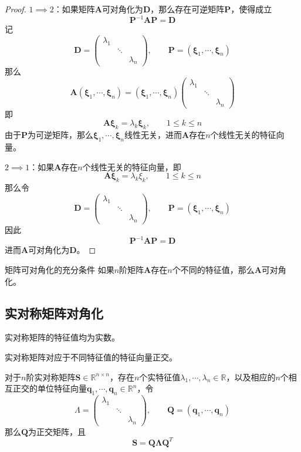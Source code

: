 \documentclass[lang = cn, scheme = chinese, thmcnt = section]{elegantbook}
\newcommand{\R}{\mathbb{R}}            %
\newcommand{\bs}{\boldsymbol}          %
\begin{document}
\begin{proof}
	$1\implies 2$：如果矩阵$\bs{A}$可对角化为$\bs{D}$，那么存在可逆矩阵$\bs{P}$，使得成立
	$$
	\bs{P}^{-1}\bs{AP}=\bs{D}
	$$
	记
	$$
	\bs{D}=\begin{pmatrix}
		\lambda_1 & & \\
		& \ddots & \\
		& & \lambda_n
	\end{pmatrix},\qquad 
	\bs{P}=(\bs{\xi}_1,\cdots,\bs{\xi}_n)
	$$
	那么
	$$
	\bs{A}(\bs{\xi}_1,\cdots,\bs{\xi}_n)=
	(\bs{\xi}_1,\cdots,\bs{\xi}_n)
	\begin{pmatrix}
		\lambda_1 & & \\
		& \ddots & \\
		& & \lambda_n
	\end{pmatrix}
	$$
	即
	$$
	\bs{A\xi}_k=\lambda_k\bs{\xi}_k,\qquad 1\le  k\le n
	$$
	由于$\bs{P}$为可逆矩阵，那么$\bs{\xi}_1,\cdots,\bs{\xi}_n$线性无关，进而$\bs{A}$存在$n$个线性无关的特征向量。
	
	$2\implies 1$：如果$\bs{A}$存在$n$个线性无关的特征向量，即
	$$
	\bs{A\xi}_k=\lambda_k\xi_k,\qquad 1\le  k\le n
	$$
	那么令
	$$
	\bs{D}=\begin{pmatrix}
		\lambda_1 & & \\
		& \ddots & \\
		& & \lambda_n
	\end{pmatrix},\qquad 
	\bs{P}=(\bs{\xi}_1,\cdots,\bs{\xi}_n)
	$$
	因此
	$$
	\bs{P}^{-1}\bs{AP}=\bs{D}
	$$
	进而$\bs{A}$可对角化为$\bs{D}$。
\end{proof}

\begin{theorem}{矩阵可对角化的充分条件}
	如果$n$阶矩阵$\bs{A}$存在$n$个不同的特征值，那么$\bs{A}$可对角化。
\end{theorem}

\subsection{实对称矩阵对角化}

\begin{theorem}
	实对称矩阵的特征值均为实数。
\end{theorem}

\begin{theorem}
	实对称矩阵对应于不同特征值的特征向量正交。
\end{theorem}

\begin{theorem}
	对于$n$阶实对称矩阵$\bs{S}\in \R^{n\times n}$，存在$n$个实特征值$\lambda_1,\cdots,\lambda_n\in\R$，以及相应的$n$个相互正交的单位特征向量$\bs{q}_1,\cdots,\bs{q}_n\in\R^n$，令
	$$
	\Lambda=\begin{pmatrix}
		\lambda_1 & & \\
		& \ddots & \\
		& & \lambda_n
	\end{pmatrix},\qquad 
	\bs{Q}=(\bs{q}_1,\cdots,\bs{q}_n)
	$$
	那么$\bs{Q}$为正交矩阵，且
	$$
	\bs{S}=\bs{Q\Lambda Q}^T
	$$
\end{theorem}
\end{document}
